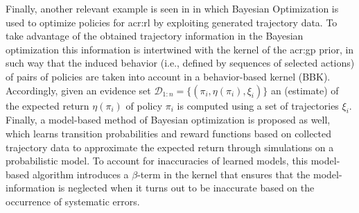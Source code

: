 Finally, another relevant example is seen in \cite{wilson2014using} in which Bayesian Optimization is used to optimize policies for \acrshort{acr:rl} by exploiting generated trajectory data.
To take advantage of the obtained trajectory information in the Bayesian optimization this information is intertwined with the kernel of the \acrshort{acr:gp} prior, in such way that the induced behavior (i.e., defined by sequences of selected actions) of pairs of policies are taken into account in a behavior-based kernel (BBK).
Accordingly, given an evidence set $\mathcal{D}_{1:n} = \{(\pi_i, \eta(\pi_i), \xi_i)\}$ an (estimate) of the expected return $\eta(\pi_i)$ of policy $\pi_i$ is computed using a set of trajectories $\xi_i$.
Finally, a model-based method of Bayesian optimization is proposed as well, which learns transition probabilities and reward functions based on collected trajectory data to approximate the expected return through simulations on a probabilistic model.
To account for inaccuracies of learned models, this model-based algorithm introduces a $\beta$-term in the kernel that ensures that the model-information is neglected when it turns out to be inaccurate based on the occurrence of systematic errors.


